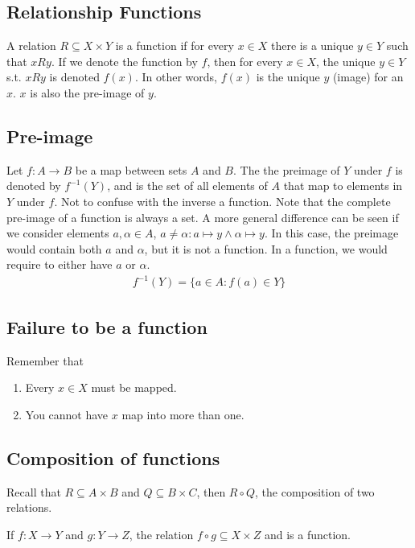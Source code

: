 \documentclass[a4paper]{article}
\theoremstyle{plain}
\newtheorem{thm}{Theorem}[section]
\theoremstyle{definition}
\newtheorem{defn}{Definition}[section]
\theoremstyle{remark}
\begin{document}
		\subsection{Relationship Functions} 
		\begin{tcolorbox}[colback=black!3!white,colframe=black!60!white,title=\begin{defn}Relation \label{Relation}\end{defn}] 
		A relation $R \subseteq X \times Y$ is a function if for every $x \in X$ there is a unique $y \in Y$ such that $xRy$. If we denote the function by $f$, then for every  $x \in X$, the unique $y \in Y$ s.t. $xRy$ is denoted $f(x)$. In other words, $f(x)$ is the unique $y$ (image) for an $x$.  $x$ is also the pre-image of $y$.  
	\end{tcolorbox} 
	\subsection{Pre-image}
	\begin{tcolorbox}[colback=black!3!white,colframe=black!60!white,title=\begin{defn}Pre-image \label{Pre-image}\end{defn}]
	Let $f: A \to B$ be a map between sets $A$ and $B$. The the preimage of $Y$ under $f$ is denoted by $f^{-1}(Y)$, and is the set of all elements of $A$ that map to elements in $Y$ under $f$. Not to confuse with the inverse a function. Note that the complete pre-image of a function is always a set. A more general difference can be seen if we consider elements  $a,  \alpha \in A$, $a \neq \alpha : a \mapsto y \land \alpha \mapsto y$. In this case, the preimage would contain both $a$ and $\alpha$, but it is not a function. In a function, we would require to either have $a$ or $\alpha$.
	\begin{align}
		f^{-1}(Y) = \{ a \in A : f(a) \in Y \}
	\end{align}
\end{tcolorbox}
\subsection{Failure to be a function}
Remember that
\begin{enumerate}
	\item Every $x \in X$ must be mapped.
	\item You cannot have $x$ map into more than one.
\end{enumerate}
\subsection{Composition of functions}
Recall that $R \subseteq A \times B$ and $Q \subseteq B \times C$, then $R \circ Q$, the composition of two relations.
\begin{tcolorbox}[colback=black!3!white,colframe=black!60!white,title=\begin{thm}Function Composition \label{Function Composition}\end{thm}]
If $f:X \to  Y$ and $g:Y \to Z$, the relation $f \circ g \subseteq X \times Z$ and is a function.
\end{tcolorbox}
\end{document}
